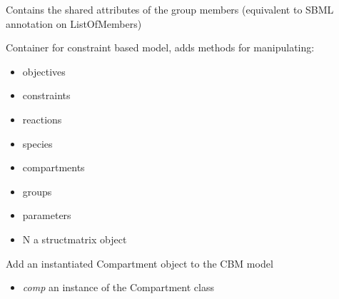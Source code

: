 \documentclass[a4paper,11pt,english]{sphinxmanual}
\begin{document}

\begin{fulllineitems}
\label{modules_doc:cbmpy.CBModel.GroupMemberAttributes}
Contains the shared attributes of the group members (equivalent to SBML annotation on ListOfMembers)

\end{fulllineitems}


\begin{fulllineitems}
\label{modules_doc:cbmpy.CBModel.Model}
Container for constraint based model, adds methods for manipulating:
\begin{itemize}
\item {} 
objectives

\item {} 
constraints

\item {} 
reactions

\item {} 
species

\item {} 
compartments

\item {} 
groups

\item {} 
parameters

\item {} 
N a structmatrix object

\end{itemize}

\begin{fulllineitems}
\label{modules_doc:cbmpy.CBModel.Model.addCompartment}
Add an instantiated Compartment object to the CBM model
\begin{itemize}
\item {} 
\emph{comp} an instance of the Compartment class

\end{itemize}

\end{fulllineitems}



\end{fulllineitems}
\end{document}
